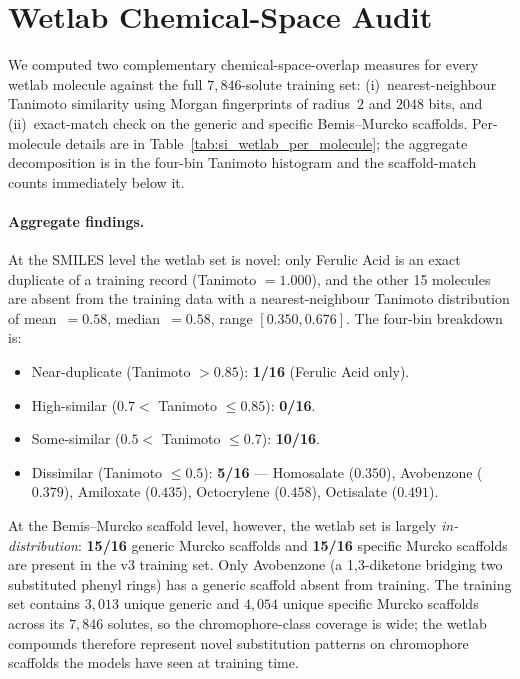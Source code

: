 \documentclass[journal=jcisd8,manuscript=suppinfo]{achemso}
\begin{document}
\section{Wetlab Chemical-Space Audit}
\label{si:wetlab_audit}

We computed two complementary chemical-space-overlap measures for every wetlab molecule against the full $7{,}846$-solute training set: (i)~nearest-neighbour Tanimoto similarity using Morgan fingerprints of radius~$2$ and $2048$ bits, and (ii)~exact-match check on the generic and specific Bemis--Murcko scaffolds. Per-molecule details are in Table~\ref{tab:si_wetlab_per_molecule}; the aggregate decomposition is in the four-bin Tanimoto histogram and the scaffold-match counts immediately below it.

\paragraph{Aggregate findings.}
At the SMILES level the wetlab set is novel: only Ferulic Acid is an exact duplicate of a training record (Tanimoto $= 1.000$), and the other 15 molecules are absent from the training data with a nearest-neighbour Tanimoto distribution of mean~$= 0.58$, median~$= 0.58$, range $[0.350, 0.676]$. The four-bin breakdown is:
\begin{itemize}[leftmargin=2em,itemsep=2pt]
 \item Near-duplicate (Tanimoto $> 0.85$): \textbf{1/16} (Ferulic Acid only).
 \item High-similar ($0.7 < $ Tanimoto $\leq 0.85$): \textbf{0/16}.
 \item Some-similar ($0.5 < $ Tanimoto $\leq 0.7$): \textbf{10/16}.
 \item Dissimilar (Tanimoto $\leq 0.5$): \textbf{5/16} --- Homosalate ($0.350$), Avobenzone ($0.379$), Amiloxate ($0.435$), Octocrylene ($0.458$), Octisalate ($0.491$).
\end{itemize}

\noindent
At the Bemis--Murcko scaffold level, however, the wetlab set is largely \emph{in-distribution}: \textbf{15/16} generic Murcko scaffolds and \textbf{15/16} specific Murcko scaffolds are present in the v3 training set. Only Avobenzone (a 1,3-diketone bridging two substituted phenyl rings) has a generic scaffold absent from training. The training set contains $3{,}013$ unique generic and $4{,}054$ unique specific Murcko scaffolds across its $7{,}846$ solutes, so the chromophore-class coverage is wide; the wetlab compounds therefore represent novel substitution patterns on chromophore scaffolds the models have seen at training time.
\end{document}
